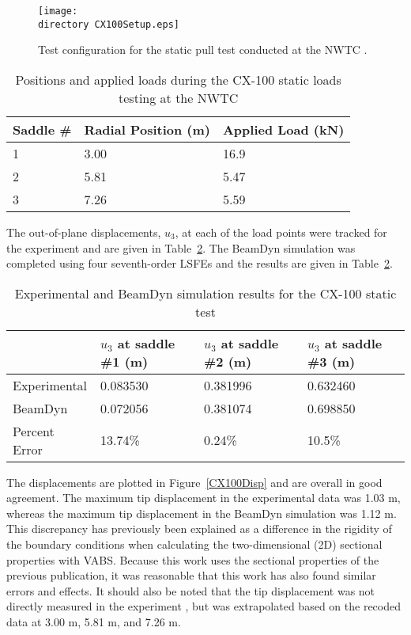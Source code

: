 \documentclass{aiaa-tc}
\def\directory{EPSF/}
\begin{document}
\begin{figure}
\centering
\texttt{[image: \\directory CX100Setup.eps]}
\caption{Test configuration for the static pull test conducted at the NWTC \cite{paquette2006modeling}.} 
\label{CX100Setup}
\end{figure}

\begin{table} 
\caption{\label{CX100Load}Positions and applied loads during the CX-100 static loads testing at the NWTC  } 
\begin{center}
    \begin{tabular}{| l | l |l |}
    	\hline
    	 Saddle \# &     Radial Position (m) & Applied Load (kN)  \\ \hline
    1&	3.00 & 16.9         \\  \hline
    2&	5.81   & 5.47         \\ \hline
    3&	    	7.26   & 5.59         \\ \hline
    \end{tabular}
\end{center}
\end{table}

The out-of-plane displacements, $u_3$, at each of the load points were tracked for the experiment and are given in Table~\ref{CX100Results}. The BeamDyn simulation was completed using four seventh-order LSFEs and the results are given in Table~\ref{CX100Results}.

\begin{table}
\caption{\label{CX100Results}Experimental and BeamDyn simulation results for the CX-100 static test  } 
\begin{center}
    \begin{tabular}{| l | l | l | l |}
    	\hline
    	             & $u_3$ at saddle \#1 (m) & $u_3$ at saddle \#2 (m) & $u_3$ at saddle \#3 (m) \\ \hline
    	Experimental & 0.083530             & 0.381996               & 0.632460             \\ \hline
    	BeamDyn      & 0.072056               & 0.381074                & 0.698850           \\ \hline
    	    	Percent Error      &        13.74\%        & 0.24\%                & 10.5\%           \\ \hline
    \end{tabular}
\end{center}
\end{table} 
The displacements are plotted in Figure~\ref{CX100Disp} and are overall in good agreement. The maximum tip displacement in the experimental data was 1.03 m, whereas the maximum tip displacement in the BeamDyn simulation was 1.12 m. This discrepancy has previously been explained\cite{Luscher:2013} as a difference in the rigidity of the boundary conditions when calculating the two-dimensional (2D) sectional properties with VABS. Because this work uses the sectional properties of the previous publication, it was reasonable that this work has also found similar errors and effects. It should also be noted that the tip displacement was not directly measured in the experiment \cite{paquette2006modeling}, but was extrapolated based on the recoded data at 3.00 m, 5.81 m, and 7.26 m.
\end{document}
